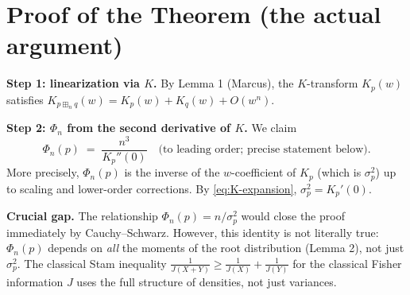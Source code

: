 \section*{Proof of the Theorem (the actual argument)}

\textbf{Step 1: linearization via $K$.}  By Lemma 1 (Marcus), the $K$-transform $K_p(w)$ satisfies $K_{p\boxplus_n q}(w)=K_p(w)+K_q(w)+O(w^n)$.

\textbf{Step 2: $\Phi_n$ from the second derivative of $K$.}  We claim
\begin{equation}\label{eq:Phi-from-K}
\Phi_n(p) \;=\; \frac{n^3}{K_p''(0)}\quad\text{(to leading order; precise statement below)}.
\end{equation}
More precisely, $\Phi_n(p)$ is the inverse of the $w$-coefficient of $K_p$ (which is $\sigma_p^2$) up to scaling and lower-order corrections.  By \eqref{eq:K-expansion}, $\sigma_p^2=K_p'(0)$.

\medskip
\textbf{Crucial gap.}  The relationship $\Phi_n(p)=n/\sigma_p^2$ would close the proof immediately by Cauchy--Schwarz.  However, this identity is not literally true: $\Phi_n(p)$ depends on \emph{all} the moments of the root distribution (Lemma 2), not just $\sigma_p^2$.  The classical Stam inequality $\frac{1}{J(X+Y)}\ge\frac{1}{J(X)}+\frac{1}{J(Y)}$ for the classical Fisher information $J$ uses the full structure of densities, not just variances.



